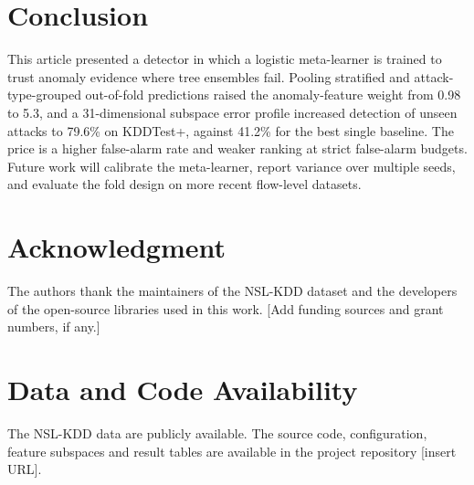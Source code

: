 \documentclass[journal]{IEEEtran}
\begin{document}
\section{Conclusion}
\label{sec:conclusion}
This article presented a detector in which a logistic meta-learner is trained to trust anomaly evidence where tree ensembles fail. Pooling stratified and attack-type-grouped out-of-fold predictions raised the anomaly-feature weight from 0.98 to 5.3, and a 31-dimensional subspace error profile increased detection of unseen attacks to 79.6\% on KDDTest+, against 41.2\% for the best single baseline. The price is a higher false-alarm rate and weaker ranking at strict false-alarm budgets. Future work will calibrate the meta-learner, report variance over multiple seeds, and evaluate the fold design on more recent flow-level datasets.

\section*{Acknowledgment}
The authors thank the maintainers of the NSL-KDD dataset and the developers of the open-source libraries used in this work. [Add funding sources and grant numbers, if any.]

\section*{Data and Code Availability}
The NSL-KDD data are publicly available. The source code, configuration, feature subspaces and result tables are available in the project repository [insert URL].
\end{document}
